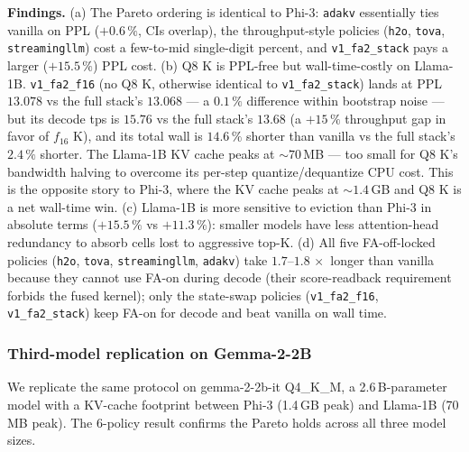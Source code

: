 \documentclass[sigconf, anonymous=false, screen=true]{acmart}
\begin{document}
\textbf{Findings.} (a) The Pareto ordering is identical to Phi-3: \texttt{adakv} essentially ties vanilla on PPL ($+0.6\,\%$, CIs overlap), the throughput-style policies (\texttt{h2o}, \texttt{tova}, \texttt{streamingllm}) cost a few-to-mid single-digit percent, and \texttt{v1\_fa2\_stack} pays a larger ($+15.5\,\%$) PPL cost. (b) Q8 K is PPL-free but wall-time-costly on Llama-1B. \texttt{v1\_fa2\_f16} (no Q8 K, otherwise identical to \texttt{v1\_fa2\_stack}) lands at PPL $13.078$ vs the full stack's $13.068$ --- a $0.1\,\%$ difference within bootstrap noise --- but its decode tps is $15.76$ vs the full stack's $13.68$ (a $+15\,\%$ throughput gap in favor of $f_{16}$ K), and its total wall is $14.6\,\%$ shorter than vanilla vs the full stack's $2.4\,\%$ shorter. The Llama-1B KV cache peaks at $\sim 70$\,MB --- too small for Q8 K's bandwidth halving to overcome its per-step quantize/dequantize CPU cost. This is the opposite story to Phi-3, where the KV cache peaks at $\sim 1.4$\,GB and Q8 K is a net wall-time win. (c) Llama-1B is more sensitive to eviction than Phi-3 in absolute terms ($+15.5\,\%$ vs $+11.3\,\%$): smaller models have less attention-head redundancy to absorb cells lost to aggressive top-K. (d) All five FA-off-locked policies (\texttt{h2o}, \texttt{tova}, \texttt{streamingllm}, \texttt{adakv}) take $1.7$--$1.8\,\times$ longer than vanilla because they cannot use FA-on during decode (their score-readback requirement forbids the fused kernel); only the state-swap policies (\texttt{v1\_fa2\_f16}, \texttt{v1\_fa2\_stack}) keep FA-on for decode and beat vanilla on wall time.

\subsubsection{Third-model replication on Gemma-2-2B}
\label{sec:gemma2b-wave11}

We replicate the same protocol on gemma-2-2b-it Q4\_K\_M, a 2.6\,B-parameter model with a KV-cache footprint between Phi-3 (1.4\,GB peak) and Llama-1B (70\,MB peak). The 6-policy result confirms the Pareto holds across all three model sizes.
\end{document}
